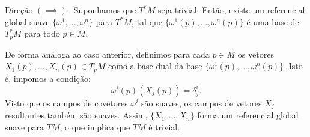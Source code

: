 {	$\text{Direção } (\implies):$
	Suponhamos que $T^*M$ seja trivial. Então, existe um referencial global suave $\{\omega^1, \dots, \omega^n\}$ para $T^*M$, tal que $\{\omega^1(p), \dots, \omega^n(p)\}$ é uma base de $T_p^* M$ para todo $p \in M$.
	
	De forma análoga ao caso anterior, definimos para cada $p \in M$ os vetores $X_1(p), \dots, X_n(p) \in T_p M$ como a base dual da base $\{\omega^1(p), \dots, \omega^n(p)\}$. Isto é, impomos a condição:
	\begin{equation*}
		\omega^i(p)(X_j(p)) = \delta^i_j.
	\end{equation*}
	Visto que os campos de covetores $\omega^i$ são suaves, os campos de vetores $X_j$ resultantes também são suaves. Assim, $\{X_1, \dots, X_n\}$ forma um referencial global suave para $TM$, o que implica que $TM$ é trivial.
}